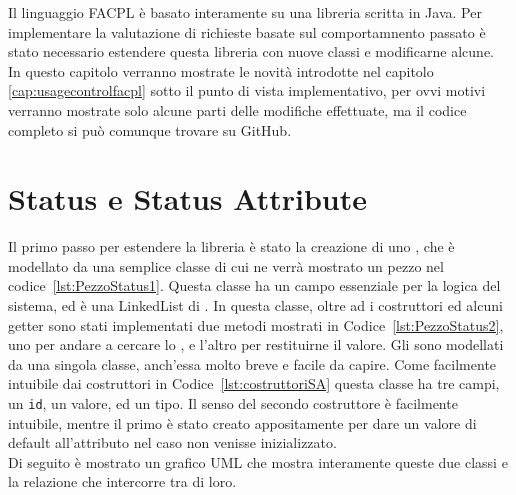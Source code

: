 \label{cap:estensione_libreria}

Il linguaggio FACPL è basato interamente su una libreria scritta in Java. 
Per implementare la valutazione di richieste basate sul comportamnento passato è stato necessario estendere questa libreria con nuove classi e modificarne alcune.\\
In questo capitolo verranno mostrate le novità introdotte nel capitolo \ref{cap:usagecontrolfacpl} sotto il punto di vista implementativo, per ovvi motivi verranno mostrate solo alcune parti delle modifiche effettuate, ma il codice completo si può comunque trovare su GitHub.

\section{Status e Status Attribute} %
\label{sec:status_e_status_attribute}
Il primo passo per estendere la libreria è stato la creazione di uno \status, che è modellato da una semplice classe 
di cui ne verrà mostrato un pezzo nel codice~\ref{lst:PezzoStatus1}.
Questa classe ha un campo essenziale per la logica del sistema, ed è una LinkedList di \statusattribute.
In questa classe, oltre ad i costruttori ed alcuni getter sono stati implementati due metodi mostrati in Codice~\ref{lst:PezzoStatus2}, uno per andare a cercare lo \statusattribute, e l'altro per restituirne il valore.
Gli \statusattribute sono modellati da una singola classe, anch'essa molto breve e facile da capire.
Come facilmente intuibile dai costruttori in Codice~\ref{lst:costruttoriSA} questa classe ha tre campi, un \texttt{id}, un valore, ed un tipo. 
Il senso del secondo costruttore è facilmente intuibile, mentre il primo è stato creato appositamente per dare un valore di default all'attributo nel caso non venisse inizializzato.\\
Di seguito è mostrato un grafico UML che mostra interamente queste due classi e la relazione che intercorre tra di loro.


